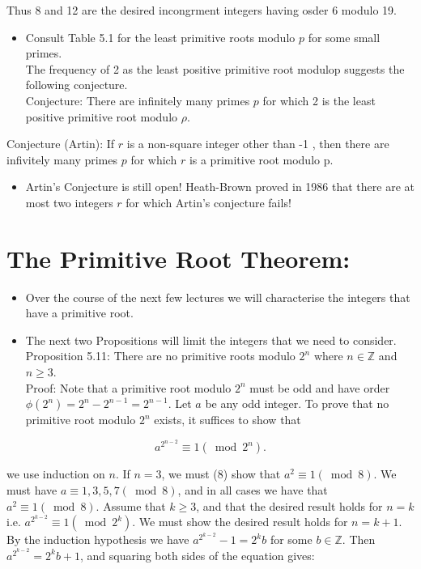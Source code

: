 \documentclass[10pt]{article}
\begin{document}
Thus 8 and 12 are the desired incongrment integers having osder 6 modulo 19.

\begin{itemize}
  \item Consult Table 5.1 for the least primitive roots modulo $p$ for some small primes.\\
The frequency of 2 as the least positive primitive root modulop suggests the following conjecture.\\
Conjecture: There are infinitely many primes $p$ for which 2 is the least positive primitive root modulo $\rho$.
\end{itemize}

Conjecture (Artin): If $r$ is a non-square integer other than -1 , then there are infivitely many primes $p$ for which $r$ is a primitive root modulo p.

\begin{itemize}
  \item Artin's Conjecture is still open! Heath-Brown proved in 1986 that there are at most two integers $r$ for which Artin's conjecture fails!
\end{itemize}

\section*{The Primitive Root Theorem:}
\begin{itemize}
  \item Over the course of the next few lectures we will characterise the integers that have a primitive root.
  \item The next two Propositions will limit the integers that we need to consider.\\
Proposition 5.11: There are no primitive roots modulo $2^{n}$ where $n \in \mathbb{Z}$ and $n \geqslant 3$.\\
Proof: Note that a primitive root modulo $2^{n}$ must be odd and have order $\phi\left(2^{n}\right)=2^{n}-2^{n-1} =2^{n-1}$. Let $a$ be any odd integer. To prove that no primitive root modulo $2^{n}$ exists, it suffices to show that
\end{itemize}

$$
a^{2^{n-2}} \equiv 1\left(\bmod 2^{n}\right) .
$$

we use induction on $n$. If $n=3$, we must (8) show that $a^{2} \equiv 1(\bmod 8)$. We must have $a \equiv 1,3,5,7(\bmod 8)$, and in all cases we have that $a^{2} \equiv 1(\bmod 8)$. Assume that $k \geqslant 3$, and that the desired result holds for $n=k$ i.e. $a^{2^{k-2}} \equiv 1\left(\bmod 2^{k}\right)$. We must show the desired result holds for $n=k+1$. By the induction hypothesis we have $a^{2^{k-2}}-1=2^{k} b$ for some $b \in \mathbb{Z}$. Then $a^{2^{k-2}}=2^{k} b+1$, and squaring both sides of the equation gives:
\end{document}
